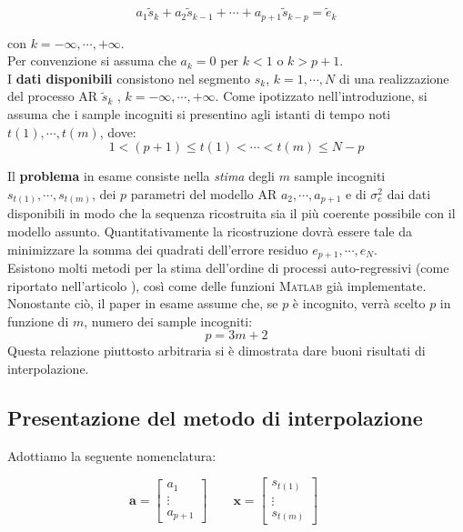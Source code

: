 \documentclass{article}
\begin{document}
\begin{equation}
a_{1}\tilde{s}_{k} + a_{2}\tilde{s}_{k-1} + \cdots + a_{p+1}\tilde{s}_{k-p} = \tilde{e}_{k}
\end{equation}

con $k =  -\infty , \cdots , +\infty $. 
\\
Per convenzione si assuma che $a_{k}=0$ per $k < 1$ o $k > p+1$. 
\medskip 
\\
I \textbf{dati disponibili} consistono nel segmento $s_{k}$, $k=1, \cdots , N$ di una realizzazione del processo AR $\tilde{s}_{k}$ , $k =  -\infty , \cdots , +\infty$. 
Come ipotizzato nell'introduzione, si assuma che i sample incogniti si presentino  agli istanti di tempo noti $t(1), \cdots , t(m)$, dove: 
\[1< (p+1) \leq t(1) < \cdots < t(m) \leq N-p \]


Il \textbf{problema} in esame consiste nella \emph{stima} degli $m$ sample incogniti\linebreak
$s_{t(1)}, \cdots , s_{t(m)} $, dei $p$ parametri del modello AR $a_{2}, \cdots ,a_{p+1}$ e di $\sigma_{e}^{2}$ dai dati disponibili in modo che la sequenza ricostruita sia il più coerente possibile con il modello assunto. Quantitativamente la ricostruzione dovrà essere tale da minimizzare la somma dei quadrati dell'errore residuo $e_{p+1}, \cdots ,e_{N}$.
\\
Esistono molti metodi per la stima dell'ordine di processi auto-regressivi (come riportato nell'articolo \cite{art4}), così come delle funzioni \textsc{Matlab} già implementate. Nonostante ciò, il paper \cite{paper_1986} in esame assume che, se $p$ è incognito, verrà scelto $p$ in funzione di $m$, numero dei sample incogniti:
\begin{equation}
p=3m+2
\end{equation}
Questa relazione piuttosto arbitraria si è dimostrata dare buoni risultati di interpolazione.

	\subsection{Presentazione del metodo di interpolazione}
Adottiamo la seguente nomenclatura:

\[ \textbf{a} = 
\left[
\begin{array}{c}
a_{1} \\ \vdots \\ a_{p+1}
\end{array}
\right] \qquad 
\textbf{x} = 
\left[
\begin{array}{c}
s_{t(1)} \\ \vdots \\ s_{t(m)}
\end{array}
\right] \qquad 
\]
\end{document}
